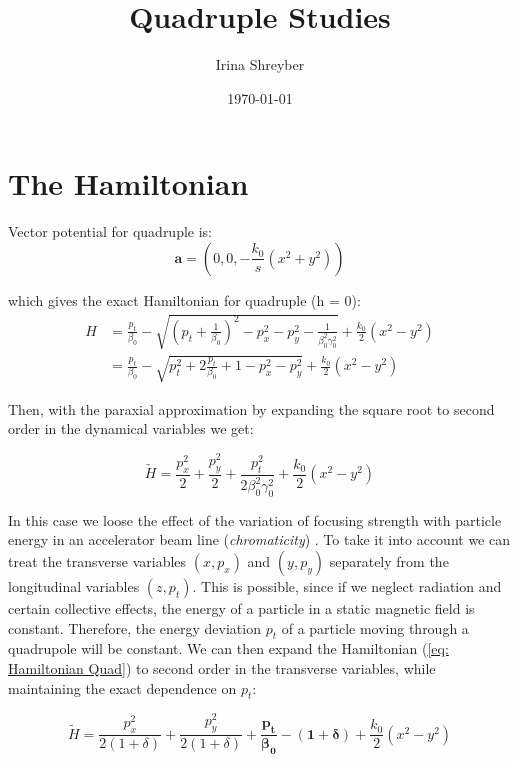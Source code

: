 \documentclass[12pt]{article}
\begin{document}
\title{Quadruple Studies}
\author{Irina Shreyber}
\date{\ddmmyyyydate\today}

\maketitle

\section{The Hamiltonian}
Vector potential for quadruple is: 
\begin{equation}
\pmb{a} = \left(0, 0, -\frac{k_{0}}{s}(x^{2} + y^{2})\right)
\end{equation}

which gives the exact Hamiltonian for quadruple (h = 0):
\begin{align}
H & = \frac{p_{t}}{\beta_{0}}-\sqrt {\left(p_{t}+\frac{1}{\beta_{0}} \right)^{2} - p_{x}^{2} - p_{y}^{2} -\frac{1}{\beta_{0}^{2}\gamma_{0}^{2}}} +\frac{k_{0}}{2}(x^{2}-y^{2}) \nonumber \\
&= \frac{p_{t}}{\beta_{0}}-\sqrt {p_{t}^{2}+2\frac{p_{t}}{\beta_{0}} + 1 - p_{x}^{2} - p_{y}^{2} } +\frac{k_{0}}{2}(x^{2}-y^{2})
\label{eq: Hamiltonian Quad}
\end{align}
 

Then,  with the paraxial approximation by expanding the square root to second order in the dynamical variables we get:

\begin{equation}
\label{eq: Hamiltonian Quad Taylor All}
\tilde{H} = \frac{p_{x}^{2}}{2} + \frac{p_{y}^{2}}{2} +  \frac{p_{t}^{2}}{2\beta_{0}^{2}\gamma_{0}^{2}} +\frac{k_{0}}{2}(x^{2}-y^{2}) 
\end{equation}

In this case we loose the effect of the variation of focusing strength with particle energy in an accelerator beam line ({\it chromaticity}) . To take it into account we can treat the transverse variables $(x, p_{x})$ and $(y, p_{y})$ separately from the longitudinal variables $(z, p_{t})$. This is possible, since if we neglect radiation and certain collective effects, the energy of a particle in a static magnetic field is constant. Therefore, the energy deviation $p_{t}$ of a particle moving through a quadrupole will be constant. We can then expand the Hamiltonian (\ref{eq: Hamiltonian Quad}) to second order in the transverse variables, while maintaining the exact dependence on  $p_{t}$: 

\begin{equation}
\label{eq: Hamiltonian Quad Taylor Part Exact}
\tilde{H} = \frac{p_{x}^{2}}{2(1+\delta)} + \frac{p_{y}^{2}}{2(1+\delta)} + \pmb{ \frac{p_{t}}{\beta_{0}} - (1+\delta)}+\frac{k_{0}}{2}(x^{2}-y^{2}) 
\end{equation}
\end{document}
